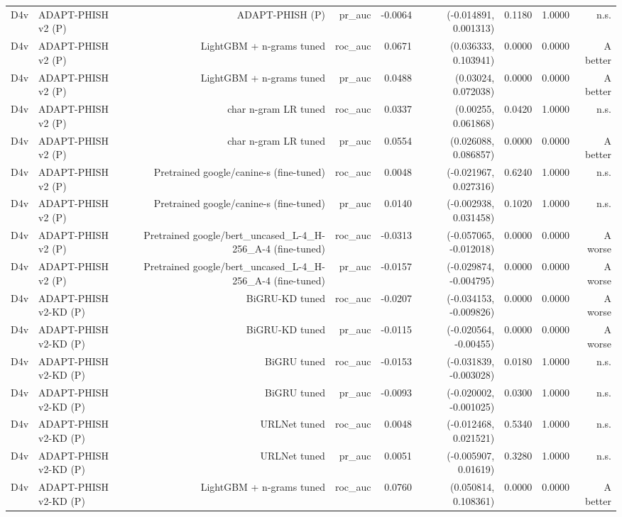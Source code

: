 \begin{table}[t]
\begin{tabular}{llrrrrrrr}
D4v & ADAPT-PHISH v2 (P) & ADAPT-PHISH (P) & pr\_auc & -0.0064 & (-0.014891, 0.001313) & 0.1180 & 1.0000 & n.s. \\
D4v & ADAPT-PHISH v2 (P) & LightGBM + n-grams tuned & roc\_auc & 0.0671 & (0.036333, 0.103941) & 0.0000 & 0.0000 & A better \\
D4v & ADAPT-PHISH v2 (P) & LightGBM + n-grams tuned & pr\_auc & 0.0488 & (0.03024, 0.072038) & 0.0000 & 0.0000 & A better \\
D4v & ADAPT-PHISH v2 (P) & char n-gram LR tuned & roc\_auc & 0.0337 & (0.00255, 0.061868) & 0.0420 & 1.0000 & n.s. \\
D4v & ADAPT-PHISH v2 (P) & char n-gram LR tuned & pr\_auc & 0.0554 & (0.026088, 0.086857) & 0.0000 & 0.0000 & A better \\
D4v & ADAPT-PHISH v2 (P) & Pretrained google/canine-s (fine-tuned) & roc\_auc & 0.0048 & (-0.021967, 0.027316) & 0.6240 & 1.0000 & n.s. \\
D4v & ADAPT-PHISH v2 (P) & Pretrained google/canine-s (fine-tuned) & pr\_auc & 0.0140 & (-0.002938, 0.031458) & 0.1020 & 1.0000 & n.s. \\
D4v & ADAPT-PHISH v2 (P) & Pretrained google/bert\_uncased\_L-4\_H-256\_A-4 (fine-tuned) & roc\_auc & -0.0313 & (-0.057065, -0.012018) & 0.0000 & 0.0000 & A worse \\
D4v & ADAPT-PHISH v2 (P) & Pretrained google/bert\_uncased\_L-4\_H-256\_A-4 (fine-tuned) & pr\_auc & -0.0157 & (-0.029874, -0.004795) & 0.0000 & 0.0000 & A worse \\
D4v & ADAPT-PHISH v2-KD (P) & BiGRU-KD tuned & roc\_auc & -0.0207 & (-0.034153, -0.009826) & 0.0000 & 0.0000 & A worse \\
D4v & ADAPT-PHISH v2-KD (P) & BiGRU-KD tuned & pr\_auc & -0.0115 & (-0.020564, -0.00455) & 0.0000 & 0.0000 & A worse \\
D4v & ADAPT-PHISH v2-KD (P) & BiGRU tuned & roc\_auc & -0.0153 & (-0.031839, -0.003028) & 0.0180 & 1.0000 & n.s. \\
D4v & ADAPT-PHISH v2-KD (P) & BiGRU tuned & pr\_auc & -0.0093 & (-0.020002, -0.001025) & 0.0300 & 1.0000 & n.s. \\
D4v & ADAPT-PHISH v2-KD (P) & URLNet tuned & roc\_auc & 0.0048 & (-0.012468, 0.021521) & 0.5340 & 1.0000 & n.s. \\
D4v & ADAPT-PHISH v2-KD (P) & URLNet tuned & pr\_auc & 0.0051 & (-0.005907, 0.01619) & 0.3280 & 1.0000 & n.s. \\
D4v & ADAPT-PHISH v2-KD (P) & LightGBM + n-grams tuned & roc\_auc & 0.0760 & (0.050814, 0.108361) & 0.0000 & 0.0000 & A better \\

\end{tabular}
\end{table}
